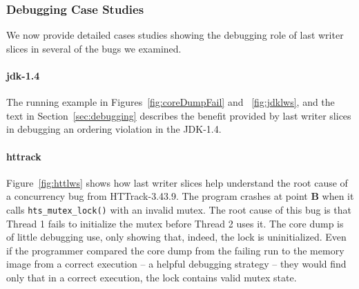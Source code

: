 \documentclass[preprint,10pt]{sigplanconf}
\begin{document}
\subsubsection{Debugging Case Studies}
\label{sec:eval:debugging:cases}

We now provide detailed cases studies showing the debugging role of last writer
slices in several of the bugs we examined.  



\paragraph{jdk-1.4}
The running example in Figures~\ref{fig:coreDumpFail} and ~\ref{fig:jdklws},
and the text in Section~\ref{sec:debugging} describes the benefit provided by
last writer slices in debugging an ordering violation in the JDK-1.4.

%


\paragraph{httrack}
Figure~\ref{fig:httlws} shows how last writer slices help understand the root
cause of a concurrency bug from HTTrack-3.43.9.  The program crashes at point
{\bf B} when it calls {\tt hts\_mutex\_lock()} with an invalid mutex.    The
root cause of this bug is that Thread 1 fails to initialize the mutex before
Thread 2 uses it.   The core dump is of little debugging use, only showing
that, indeed, the lock is uninitialized.  Even if the programmer compared the
core dump from the failing run to the memory image from a correct execution --
a helpful debugging strategy -- they would find only that in a correct
execution, the lock contains valid mutex state.
\end{document}
